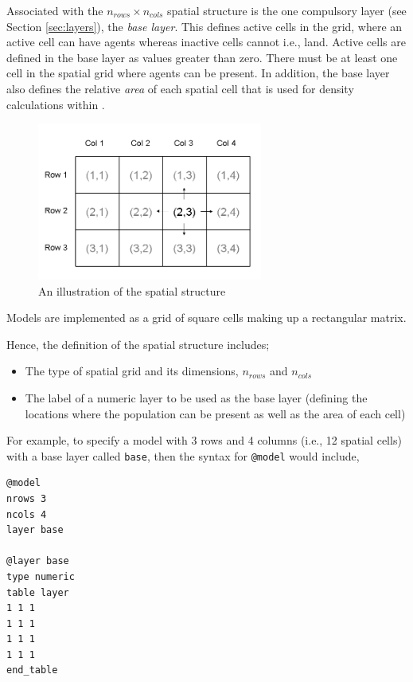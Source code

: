 Associated with the $n_{rows} \times n_{cols}$ spatial structure is the one compulsory layer (see Section \ref{sec:layers}), the \emph{base layer}. This defines active cells in the grid, where an active cell can have agents whereas inactive cells cannot i.e., land. Active cells are defined in the base layer as values greater than zero. There must be at least one cell in the spatial grid where agents can be present. In addition, the base layer also defines the relative \emph{area} of each spatial cell that is used for density calculations within \IBM.

\begin{figure}[htp]
	\centering
	\includegraphics[width=0.66\textwidth]{Figures/SquareStructure}
	\caption{An illustration of the spatial structure}
	\label{fig:SquareSpatialStructure}
\end{figure}

Models are implemented as a grid of square cells making up a rectangular matrix.

Hence, the definition of the spatial structure includes;
\begin{itemize}
	\item The type of spatial grid and its dimensions, $n_{rows}$ and $n_{cols}$
	\item The label of a numeric layer to be used as the base layer (defining the locations where the population can be present as well as the area of each cell)
\end{itemize}

For example, to specify a model with 3 rows and 4 columns (i.e., 12 spatial cells) with a base layer called \texttt{base}, then the syntax for \texttt{@model} would include,

{\small{\begin{verbatim}
@model
nrows 3
ncols 4
layer base
		
@layer base
type numeric
table layer
1 1 1 
1 1 1
1 1 1
1 1 1 
end_table		
\end{verbatim}}}


